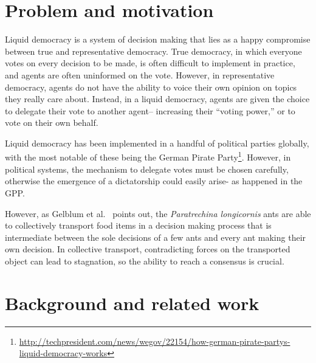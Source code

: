\documentclass[12pt]{article}
\begin{document}

\section{Problem and motivation}
Liquid democracy is a system of decision making that lies as a happy compromise between true and representative democracy.
True democracy, in which everyone votes on every decision to be made, is often difficult to implement in practice, and agents are often uninformed on the vote.
However, in representative democracy, agents do not have the ability to voice their own opinion on topics they really care about.
Instead, in a liquid democracy, agents are given the choice to delegate their vote to another agent-- increasing their ``voting power,'' or to vote on their own behalf.


Liquid democracy has been implemented in a handful of political parties globally, with the most notable of these being the German Pirate Party\footnote{\url{http://techpresident.com/news/wegov/22154/how-german-pirate-partys-liquid-democracy-works}}.
However, in political systems, the mechanism to delegate votes must be chosen carefully, otherwise the emergence of a dictatorship could easily arise- as happened in the GPP.

However, as Gelblum et al.~\cite{gelblum2015ant} points out, the \emph{Paratrechina longicornis} ants are able to collectively transport food items in a decision making process that is intermediate between the sole decisions of a few ants and every ant making their own decision.
In collective transport, contradicting forces on the transported object can lead to stagnation, so the ability to reach a consensus is crucial.

\section{Background and related work}
\end{document}
